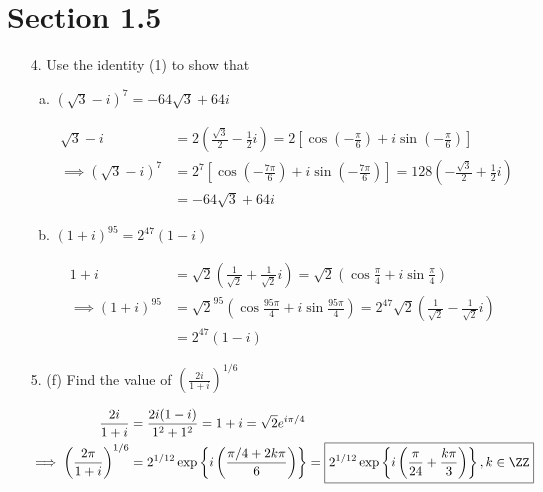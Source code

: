 \documentclass{article}
\begin{document}
\section*{Section 1.5}

\begin{itemize}
	\item[4.] Use the identity (1) to show that
		\begin{enumerate}[(a)]
			\item $(\sqrt{3}-i)^7=-64\sqrt{3}+64i$
				\begin{soln}
					\begin{align*}
						\sqrt{3}-i &= 2\left( \frac{\sqrt{3}}{2} - \frac{1}{2}i \right) = 2\left[ \cos\left( -\frac{\pi}{6} \right) + i\sin\left( -\frac{\pi}{6} \right) \right] \\
						\implies \left( \sqrt{3}-i \right)^7 &= 2^7 \left[ \cos \left( -\frac{7\pi}{6} \right) + i\sin\left( -\frac{7\pi}{6} \right) \right] = 128\left( -\frac{\sqrt{3}}{2} + \frac{1}{2}i \right) \\
						&= -64\sqrt{3} + 64i
					\end{align*}
				\end{soln}

			\item $(1+i)^{95}=2^{47}(1-i)$
				\begin{soln}
					\begin{align*}
						1+i &= \sqrt{2}\left( \frac{1}{\sqrt{2}} + \frac{1}{\sqrt{2}}i \right) = \sqrt{2}\left( \cos\frac{\pi}{4} + i\sin\frac{\pi}{4} \right) \\
						\implies (1+i)^{95} &= \sqrt{2}^{95}\left( \cos \frac{95\pi}{4} + i\sin\frac{95\pi}{4} \right) = 2^{47}\sqrt{2}\left( \frac{1}{\sqrt{2}} - \frac{1}{\sqrt{2}}i \right) \\
						&= 2^{47}(1-i)
					\end{align*}
				\end{soln}
				
		\end{enumerate}
		\newpage

	\item[5.] (f) Find the value of $\left( \frac{2i}{1+i} \right)^{1/6}$
		\begin{soln}
			\begin{align*}
				\frac{2i}{1+i} &= \frac{2i(1-i)}{1^2+1^2} = 1 + i = \sqrt{2}e^{i\pi/4} \\
				\implies \left( \frac{2\pi}{1+i} \right)^{1/6} &= 2^{1/12} \exp\left\{ i\left( \frac{\pi/4+2k\pi}{6}\right) \right\} = \boxed{2^{1/12}\exp\left\{ i\left( \frac{\pi}{24} + \frac{k\pi}{3} \right) \right\}, k\in\ZZ}
			\end{align*}
		\end{soln}

\end{itemize}
\end{document}
